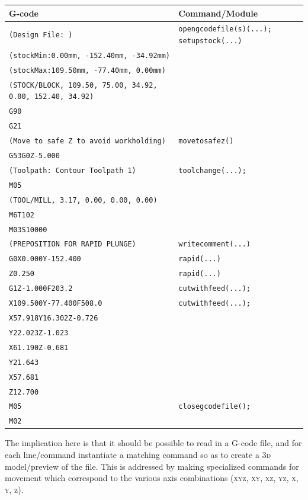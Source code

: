 \documentclass{ltxdoc}
\begin{document}
\bigskip

\noindent \begin{tabular}{@{}ll@{}} \toprule
 G-code                                                           & Command/Module \\ \midrule
 \verb|(Design File: )| &  \texttt{opengcodefile(s)(...);}
                           \texttt{setupstock(...)}\\
 \verb|(stockMin:0.00mm, -152.40mm, -34.92mm)| \\
 \verb|(stockMax:109.50mm, -77.40mm, 0.00mm)| \\
 \verb|(STOCK/BLOCK, 109.50, 75.00, 34.92, 0.00, 152.40, 34.92)| \\
 \verb|G90| \\
 \verb|G21| \\ \midrule
 \verb|(Move to safe Z to avoid workholding)| &  \texttt{movetosafez()} \\
 \verb|G53G0Z-5.000| \\ \midrule
 \verb|(Toolpath: Contour Toolpath 1)| &  \texttt{toolchange(...);}\\
 \verb|M05| \\
 \verb|(TOOL/MILL, 3.17, 0.00, 0.00, 0.00)| \\
 \verb|M6T102| \\
 \verb|M03S10000|  \\ \midrule
 \verb|(PREPOSITION FOR RAPID PLUNGE)| & \texttt{writecomment(...)}\\ \midrule
 \verb|G0X0.000Y-152.400| & \texttt{rapid(...)}\\
 \verb|Z0.250| & \texttt{rapid(...)}\\ \midrule
 \verb|G1Z-1.000F203.2| & \texttt{cutwithfeed(...);}\\  
 \verb|X109.500Y-77.400F508.0| & \texttt{cutwithfeed(...);} \\ 
 \verb|X57.918Y16.302Z-0.726|\\ 
 \verb|Y22.023Z-1.023|\\ 
 \verb|X61.190Z-0.681|\\ 
 \verb|Y21.643|\\ 
 \verb|X57.681|\\
 \verb|Z12.700|\\ \midrule
 \verb|M05| &  \texttt{closegcodefile();}\\
 \verb|M02|\\
 \bottomrule
 \end{tabular}
\bigskip

The implication here is that it should be possible to read in a G-code file, and for each line/\allowbreak command instantiate a matching command so as to create a \textsc{3d} model/preview  of the file. This is addressed by making specialized commands for movement which correspond to the various axis combinations (\textsc{xyz}, \textsc{xy}, \textsc{xz}, \textsc{yz}, \textsc{x}, \textsc{y}, \textsc{z}).
\end{document}
